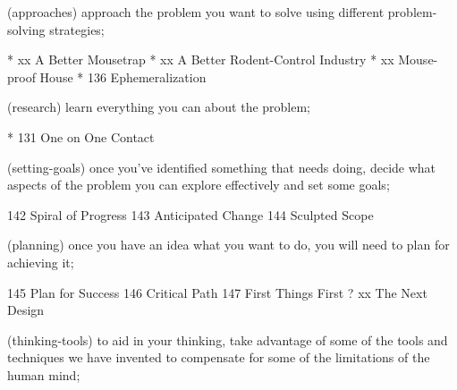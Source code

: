 (approaches) approach the problem you want to solve using different problem-solving strategies;

*	xx  A Better Mousetrap   %
* 	xx  A Better Rodent-Control Industry   %
*	xx  Mouse-proof House   %
*	136  Ephemeralization

(research) learn everything you can about the problem;

*	131  One on One Contact

(setting-goals) once you've identified something that needs doing, decide what aspects of the problem you can explore effectively and set some goals;

	142  Spiral of Progress
	143  Anticipated Change
	144  Sculpted Scope

(planning) once you have an idea what you want to do, you will need to plan for achieving it;

	145  Plan for Success
	146  Critical Path
	147  First Things First
?	xx  The Next Design   %

(thinking-tools) to aid in your thinking, take advantage of some of the tools and techniques we have invented to compensate for some of the limitations of the human mind;

